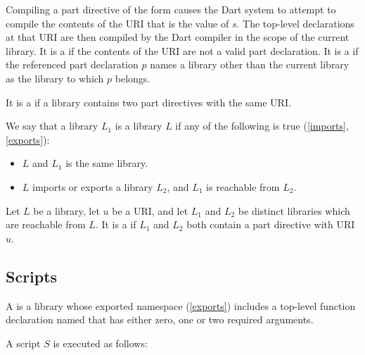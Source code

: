\documentclass[makeidx]{article}
\begin{document}
{\LMHash{}%
Compiling a part directive of the form 
causes the Dart system to attempt to compile the contents of
the URI that is the value of $s$.
The top-level declarations at that URI are then compiled by the Dart compiler
in the scope of the current library.
It is a  if the contents of the URI are not
a valid part declaration.
It is a  if the referenced part declaration $p$ names
a library other than the current library as the library to which $p$ belongs.

\LMHash{}%
It is a  if a library contains
two part directives with the same URI.

\LMHash{}%
We say that a library $L_1$ is  a library $L$ if
any of the following is true (\ref{imports}, \ref{exports}):
\begin{itemize}
\item $L$ and $L_1$ is the same library.
\item $L$ imports or exports a library $L_2$, and $L_1$ is reachable from $L_2$.
\end{itemize}

\LMHash{}%
Let $L$ be a library, let $u$ be a URI,
and let $L_1$ and $L_2$ be distinct libraries which are reachable from $L$.
It is a  if $L_1$ and $L_2$ both contain
a part directive with URI $u$.



\subsection{Scripts}

\LMHash{}%
A  is a library whose exported namespace (\ref{exports}) includes
a top-level function declaration named 
that has either zero, one or two required arguments.

A script $S$ is executed as follows:

}
\end{document}
